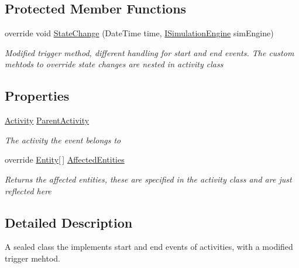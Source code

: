 \subsection*{Protected Member Functions}
\begin{DoxyCompactItemize}
\item 
override void \hyperlink{class_simulation_core_1_1_h_c_c_m_elements_1_1_event_activity_acfeccc7e94cc223258a4e611eeb0d703}{State\+Change} (Date\+Time time, \hyperlink{interface_simulation_core_1_1_simulation_classes_1_1_i_simulation_engine}{I\+Simulation\+Engine} sim\+Engine)
\begin{DoxyCompactList}\small\item\em Modified trigger method, different handling for start and end events. The custom mehtods to override state changes are nested in activity class \end{DoxyCompactList}\end{DoxyCompactItemize}
\subsection*{Properties}
\begin{DoxyCompactItemize}
\item 
\hyperlink{class_simulation_core_1_1_h_c_c_m_elements_1_1_activity}{Activity} \hyperlink{class_simulation_core_1_1_h_c_c_m_elements_1_1_event_activity_a70575fed22fd7c33c9d62204ce459ccb}{Parent\+Activity}
\begin{DoxyCompactList}\small\item\em The activity the event belongs to \end{DoxyCompactList}\item 
override \hyperlink{class_simulation_core_1_1_h_c_c_m_elements_1_1_entity}{Entity}\mbox{[}$\,$\mbox{]} \hyperlink{class_simulation_core_1_1_h_c_c_m_elements_1_1_event_activity_a439e12a2947b67299b977f40e9790214}{Affected\+Entities}
\begin{DoxyCompactList}\small\item\em Returns the affected entities, these are specified in the activity class and are just reflected here \end{DoxyCompactList}\end{DoxyCompactItemize}


\subsection{Detailed Description}
A sealed class the implements start and end events of activities, with a modified trigger mehtod. 



